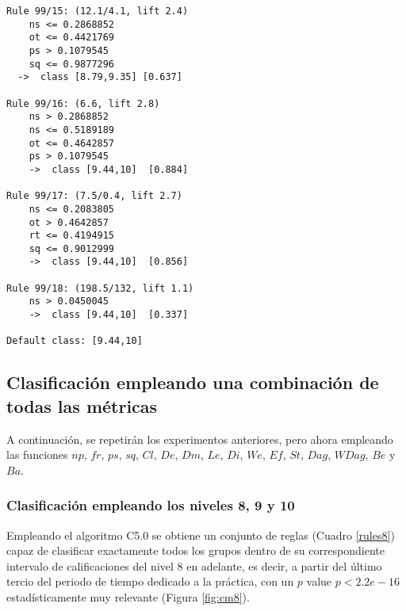 \begin{tcolorbox}[title=Reglas de clasificación para identificar intervalos de notas.]
\begin{multicols}{3}
\begin{verbatim}
Rule 99/15: (12.1/4.1, lift 2.4)
	ns <= 0.2868852
	ot <= 0.4421769
	ps > 0.1079545
	sq <= 0.9877296
  ->  class [8.79,9.35] [0.637]

Rule 99/16: (6.6, lift 2.8)
	ns > 0.2868852
	ns <= 0.5189189
	ot <= 0.4642857
	ps > 0.1079545
	->  class [9.44,10]  [0.884]

Rule 99/17: (7.5/0.4, lift 2.7)
	ns <= 0.2083805
	ot > 0.4642857
	rt <= 0.4194915
	sq <= 0.9012999
	->  class [9.44,10]  [0.856]

Rule 99/18: (198.5/132, lift 1.1)
	ns > 0.0450045
	->  class [9.44,10]  [0.337]
	
Default class: [9.44,10]
    \end{verbatim}
  \end{multicols}
\end{tcolorbox}

\subsection{Clasificación empleando una combinación de todas las métricas}

A continuación, se repetirán los experimentos anteriores, pero ahora empleando las funciones $np$, $fr$, $ps$, $sq$, $Cl$, $De$, $Dm$, $Le$, $Di$, $We$, $Ef$, $St$, $Dag$, $WDag$, $Be$ y $Ba$.

\subsubsection{Clasificación empleando los niveles 8, 9 y 10}

Empleando el algoritmo C5.0 se obtiene un conjunto de reglas (Cuadro \ref{rules8}) capaz de clasificar exactamente todos los grupos dentro de su correspondiente intervalo de calificaciones del nivel $8$ en adelante, es decir, a partir del último tercio del periodo de tiempo dedicado a la práctica, con un $p$ value $p < 2.2e-16$ estadísticamente muy relevante (Figura \ref{fig:cm8}).

